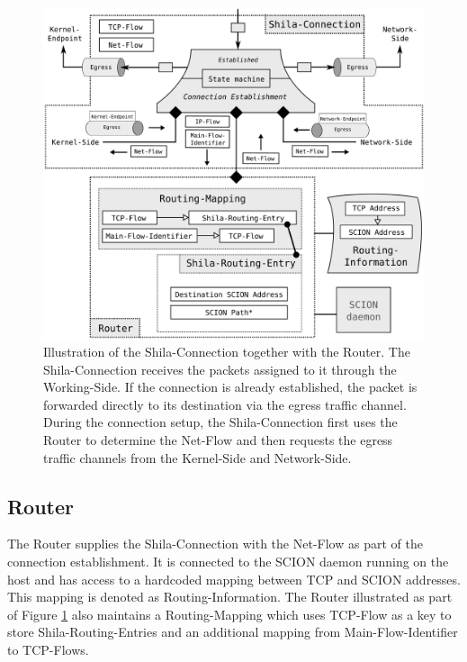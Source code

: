 \begin{figure}
	\begin{center}
		\def\svgwidth{1\textwidth}
		\includegraphics[scale=0.2]{../illustrations/implementation/PartsShilaConnection.pdf}   
		\caption[Caption for the list of figures.]{Illustration of the Shila-Connection together with the Router. The Shila-Connection receives the packets assigned to it through the Working-Side. If the connection is already established, the packet is forwarded directly to its destination via the egress traffic channel. During the connection setup, the Shila-Connection first uses the Router to determine the Net-Flow and then requests the egress traffic channels from the Kernel-Side and Network-Side.}
		\label{fig:ImplementationShilaConnection}
	\end{center}
\end{figure}

\subsection{Router}
\label{sec:ImplementationRouter}

The Router supplies the Shila-Connection with the Net-Flow as part of the connection establishment. It is connected to the SCION daemon running on the host and has access to a hardcoded mapping between TCP and SCION addresses. This mapping is denoted as Routing-Information. The Router illustrated as part of Figure \ref{fig:ImplementationShilaConnection} also maintains a Routing-Mapping which uses TCP-Flow as a key to store Shila-Routing-Entries and an additional mapping from Main-Flow-Identifier to TCP-Flows.

